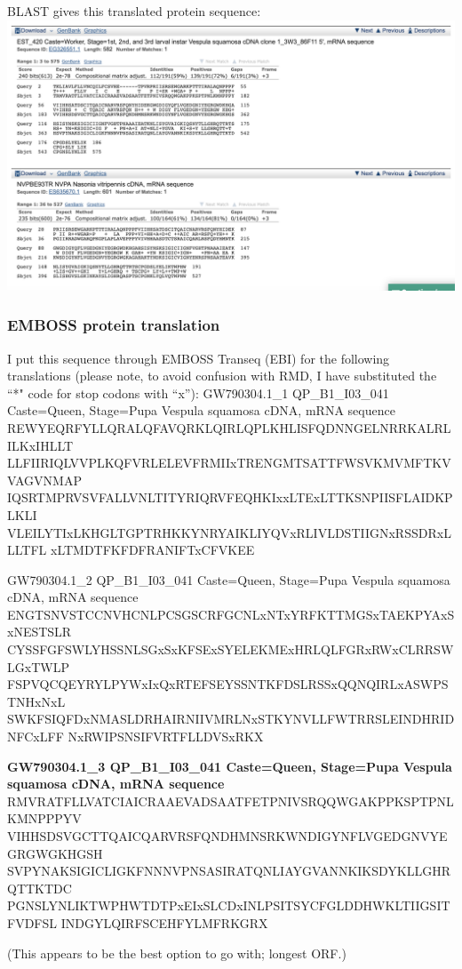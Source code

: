 \documentclass[]{article}
\begin{document}
BLAST gives this translated protein sequence: \includegraphics{q3.png}

\subsubsection{EMBOSS protein
translation}\label{emboss-protein-translation}

I put this sequence through EMBOSS Transeq (EBI) for the following
translations (please note, to avoid confusion with RMD, I have
substituted the ``*" code for stop codons with ``x''): GW790304.1\_1
QP\_B1\_I03\_041 Caste=Queen, Stage=Pupa Vespula squamosa cDNA, mRNA
sequence REWYEQRFYLLQRALQFAVQRKLQIRLQPLKHLISFQDNNGELNRRKALRLILKxIHLLT
LLFIIRIQLVVPLKQFVRLELEVFRMIIxTRENGMTSATTFWSVKMVMFTKVVAGVNMAP
IQSRTMPRVSVFALLVNLTITYRIQRVFEQHKIxxLTExLTTKSNPIISFLAIDKPLKLI
VLEILYTIxLKHGLTGPTRHKKYNRYAIKLIYQVxRLIVLDSTIIGNxRSSDRxLLLTFL
xLTMDTFKFDFRANIFTxCFVKEE

GW790304.1\_2 QP\_B1\_I03\_041 Caste=Queen, Stage=Pupa Vespula squamosa
cDNA, mRNA sequence
ENGTSNVSTCCNVHCNLPCSGSCRFGCNLxNTxYRFKTTMGSxTAEKPYAxSxNESTSLR
CYSSFGFSWLYHSSNLSGxSxKFSExSYELEKMExHRLQLFGRxRWxCLRRSWLGxTWLP
FSPVQCQEYRYLPYWxIxQxRTEFSEYSSNTKFDSLRSSxQQNQIRLxASWPSTNHxNxL
SWKFSIQFDxNMASLDRHAIRNIIVMRLNxSTKYNVLLFWTRRSLEINDHRIDNFCxLFF
NxRWIPSNSIFVRTFLLDVSxRKX

\textbf{GW790304.1\_3 QP\_B1\_I03\_041 Caste=Queen, Stage=Pupa Vespula
squamosa cDNA, mRNA sequence}
RMVRATFLLVATCIAICRAAEVADSAATFETPNIVSRQQWGAKPPKSPTPNLKMNPPPYV
VIHHSDSVGCTTQAICQARVRSFQNDHMNSRKWNDIGYNFLVGEDGNVYEGRGWGKHGSH
SVPYNAKSIGICLIGKFNNNVPNSASIRATQNLIAYGVANNKIKSDYKLLGHRQTTKTDC
PGNSLYNLIKTWPHWTDTPxEIxSLCDxINLPSITSYCFGLDDHWKLTIIGSITFVDFSL
INDGYLQIRFSCEHFYLMFRKGRX

(This appears to be the best option to go with; longest ORF.)
\end{document}
